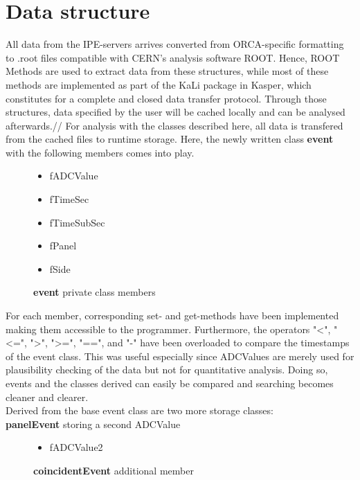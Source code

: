   \section{Data structure}
  \label{ch:Analysis software:sec:Data structure}
    All data from the IPE-servers arrives converted from ORCA-specific formatting to .root files compatible with CERN's analysis software ROOT. Hence, ROOT Methods are used to extract data from these structures, while most of these methods are implemented as part of the KaLi package in Kasper, which constitutes for a complete and closed data transfer protocol.
    Through those structures, data specified by the user will be cached locally and can be analysed afterwards.//
    For analysis with the classes described here, all data is transfered from the cached files to runtime storage. 
    Here, the newly written class {\bf event} with the following members comes into play.
    \begin{figure}[H]
      \caption*{{\bf event} private class members}
      \begin{itemize}
	\item fADCValue
    	\item fTimeSec
    	\item fTimeSubSec
    	\item fPanel
    	\item fSide
      \end{itemize}
    \end{figure}
    For each member, corresponding set- and get-methods have been implemented making them accessible to the programmer. Furthermore, the operators "<", "<=", ">", ">=", "==", and "-" have been overloaded to compare the timestamps of the event class. This was useful especially since ADCValues are merely used for plausibility checking of the data but not for quantitative analysis. Doing so, events and the classes derived can easily be compared and searching becomes cleaner and clearer.\\
    Derived from the base event class are two more storage classes:\\
    {\bf panelEvent} storing a second ADCValue
    \begin{figure}[H]
      \caption*{{\bf coincidentEvent} additional member}
      \begin{itemize}
	\item fADCValue2
      \end{itemize}
    \end{figure}
	

